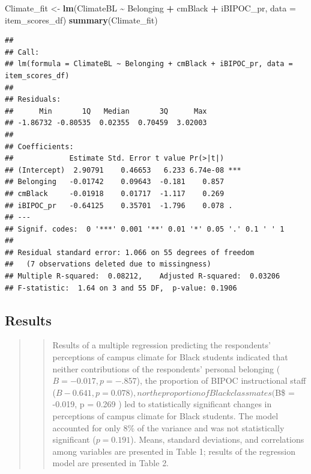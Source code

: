 \documentclass[
  11pt,
]{book}
\newenvironment{Shaded}{\begin{snugshade}}{\end{snugshade}}
\newcommand{\AttributeTok}[1]{\textcolor[rgb]{0.27,0.27,0.27}{#1}}
\newcommand{\FunctionTok}[1]{\textcolor[rgb]{0.27,0.27,0.27}{\textbf{#1}}}
\newcommand{\NormalTok}[1]{#1}
\newcommand{\OtherTok}[1]{\textcolor[rgb]{0.37,0.37,0.37}{#1}}
\newcommand{\SpecialCharTok}[1]{\textcolor[rgb]{0.43,0.43,0.43}{\textbf{#1}}}
\begin{document}
\begin{Shaded}
\begin{Highlighting}[]
\NormalTok{Climate\_fit }\OtherTok{\textless{}{-}} \FunctionTok{lm}\NormalTok{(ClimateBL }\SpecialCharTok{\textasciitilde{}}\NormalTok{ Belonging }\SpecialCharTok{+}\NormalTok{ cmBlack }\SpecialCharTok{+}\NormalTok{ iBIPOC\_pr, }\AttributeTok{data =}\NormalTok{ item\_scores\_df)}
\FunctionTok{summary}\NormalTok{(Climate\_fit)}
\end{Highlighting}
\end{Shaded}

\begin{verbatim}
## 
## Call:
## lm(formula = ClimateBL ~ Belonging + cmBlack + iBIPOC_pr, data = item_scores_df)
## 
## Residuals:
##      Min       1Q   Median       3Q      Max 
## -1.86732 -0.80535  0.02355  0.70459  3.02003 
## 
## Coefficients:
##             Estimate Std. Error t value Pr(>|t|)    
## (Intercept)  2.90791    0.46653   6.233 6.74e-08 ***
## Belonging   -0.01742    0.09643  -0.181    0.857    
## cmBlack     -0.01918    0.01717  -1.117    0.269    
## iBIPOC_pr   -0.64125    0.35701  -1.796    0.078 .  
## ---
## Signif. codes:  0 '***' 0.001 '**' 0.01 '*' 0.05 '.' 0.1 ' ' 1
## 
## Residual standard error: 1.066 on 55 degrees of freedom
##   (7 observations deleted due to missingness)
## Multiple R-squared:  0.08212,    Adjusted R-squared:  0.03206 
## F-statistic:  1.64 on 3 and 55 DF,  p-value: 0.1906
\end{verbatim}

\hypertarget{results-1}{%
\subsection{Results}\label{results-1}}

\begin{quote}
\begin{quote}
Results of a multiple regression predicting the respondents' perceptions of campus climate for Black students indicated that neither contributions of the respondents' personal belonging (\(B = -0.017, p = -.857\)), the proportion of BIPOC instructional staff (\(B-0.641, p = 0.078), nor the proportion of Black classmates (\)B\$ = -0.019, p = 0.269 ) led to statistically significant changes in perceptions of campus climate for Black students. The model accounted for only 8\% of the variance and was not statistically significant (\(p = 0.191\)). Means, standard deviations, and correlations among variables are presented in Table 1; results of the regression model are presented in Table 2.
\end{quote}
\end{quote}
\end{document}
